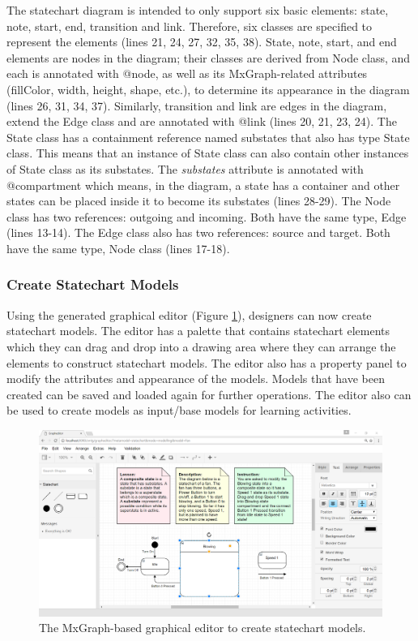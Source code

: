 \documentclass[12pt, a4paper]{report} \usepackage[titletoc]{appendix}
\begin{document}
The statechart diagram is intended to only support six basic elements: state, note, start, end, transition and link. Therefore, six classes are specified to represent the elements (lines 21, 24, 27, 32, 35, 38). State, note, start, and end elements are nodes in the diagram; their classes are derived from Node class, and each is annotated with {\selectfont @node}, as well as its MxGraph-related attributes (fillColor, width, height, shape, etc.), to determine its appearance in the diagram (lines 26, 31, 34, 37). Similarly, transition and link are edges in the diagram, extend the Edge class and are annotated with {\selectfont @link} (lines 20, 21, 23, 24). The State class has a containment reference named substates that also has type State class. This means that an instance of State class can also contain other instances of State class as its substates. The \emph{substates} attribute is annotated with {\selectfont @compartment} which means, in the diagram, a state has a container and other states can be placed inside it to become its substates (lines 28-29). The Node class has two references: outgoing and incoming. Both have the same type, Edge (lines 13-14). The Edge class also has two references: source and target. Both have the same type, Node class (lines 17-18).



\subsubsection{Create Statechart Models}
Using the generated graphical editor (Figure \ref{ide}), designers can now create statechart models. The editor has a palette that contains statechart elements which they can drag and drop into a drawing area where they can arrange the elements to construct statechart models. The editor also has a property panel to modify the attributes and appearance of the models. Models that have been created can be saved and loaded again for further operations. The editor also can be used to create models as input/base models for learning activities. 

\begin{figure}[t!]
\centering
\includegraphics[width=12cm]{ide}
\caption{The MxGraph-based graphical editor to create statechart models.}
\label{ide}
\end{figure}
\end{document}
